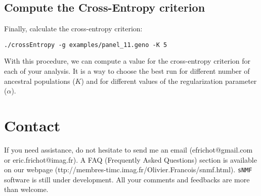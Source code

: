 \documentclass[10pt,a4paper]{article}
\begin{document}
\subsection{Compute the Cross-Entropy criterion}

Finally, calculate the cross-entropy criterion:
\begin{Verbatim}[frame=single]
./crossEntropy -g examples/panel_11.geno -K 5
\end{Verbatim}

\noindent
With this procedure, we can compute a value for the cross-entropy criterion for each of your analysis. 
It is a way to  choose the best run for different number of ancestral populations ($K$) and for 
different values of the regularization parameter ($\alpha$).

\section{Contact}
If you need assistance, do not hesitate to send me an email (efrichot@gmail.com or eric.frichot@imag.fr). 
A FAQ (Frequently Asked Questions) section is available 
on our webpage (ttp://membres-timc.imag.fr/Olivier.Francois/snmf.html). 
{\tt sNMF} software is still under development. All your comments and feedbacks are more than welcome.



\end{document}
